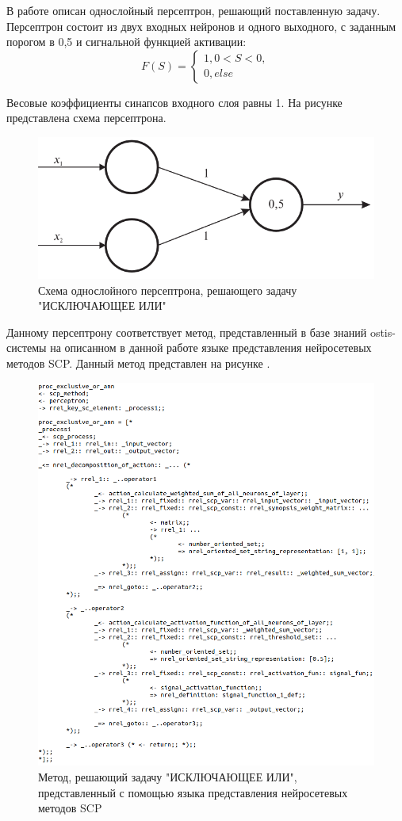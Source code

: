 В работе  описан однослойный персептрон, решающий поставленную задачу. Персептрон состоит из двух входных нейронов и одного выходного, с заданным порогом в 0,5 и сигнальной функцией активации:
\begin{equation*}
	F(S) =
	\begin{cases}
		1, 0 < S < 0,\\
		0, else
	\end{cases}
\end{equation*}

Весовые коэффициенты синапсов входного слоя равны 1. На рисунке \textit{} представлена схема персептрона.

\begin{figure}
	\centering
	\includegraphics[width=0.5\linewidth]{author/part3/figures/strong_or_ann.png}
	\caption{Схема однослойного персептрона, решающего задачу "ИСКЛЮЧАЮЩЕЕ ИЛИ"}
	\label{fig:strong_or_ann}
\end{figure}

Данному персептрону соответствует метод, представленный в базе знаний ostis-системы на описанном в данной работе языке представления нейросетевых методов SCP. Данный метод представлен на рисунке \textit{}.

\begin{figure}
	\centering
	\includegraphics[width=0.95\linewidth]{author/part3/figures/exclusive_or_ann_scp.png}
	\caption{Метод, решающий задачу "ИСКЛЮЧАЮЩЕЕ ИЛИ", представленный с помощью языка представления нейросетевых методов SCP}
	\label{fig:exclusive_or_ann_scp}
\end{figure}

